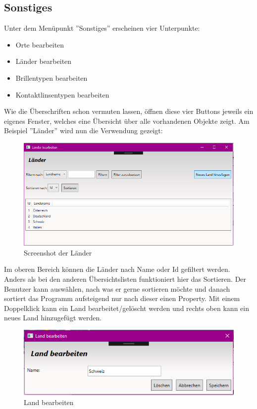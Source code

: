 \subsection{Sonstiges}
Unter dem Menüpunkt ''Sonstiges'' erscheinen vier Unterpunkte: 
\begin{itemize}
\item Orte bearbeiten
\item Länder bearbeiten
\item Brillentypen bearbeiten
\item Kontaktlinsentypen bearbeiten
\end{itemize}
Wie die Überschriften schon vermuten lassen, öffnen diese vier Buttons jeweils ein eigenes Fenster, welches eine Übersicht über alle vorhandenen Objekte zeigt. Am Beispiel ''Länder'' wird nun die Verwendung gezeigt:
\begin{figure}[H]
\begin{center}
	\includegraphics[scale=0.75]{images/Laender.png}
\end{center}
	\caption{Screenshot der L\"ander}
	\label{fig:sample}
\end{figure} 
Im oberen Bereich können die Länder nach Name oder Id gefiltert werden. Anders als bei den anderen Übersichtslisten funktioniert hier das Sortieren. Der Benutzer kann auswählen, nach was er gerne sortieren möchte und danach sortiert das Programm aufsteigend nur nach dieser einen Property. Mit einem Doppelklick kann ein Land bearbeitet/gelöscht werden und rechts oben kann ein neues Land hinzugefügt werden.
\begin{figure}[H]
\begin{center}
	\includegraphics[scale=0.75]{images/LandBearbeiten.png}
\end{center}
	\caption{Land bearbeiten}
	\label{fig:sample}
\end{figure} 
